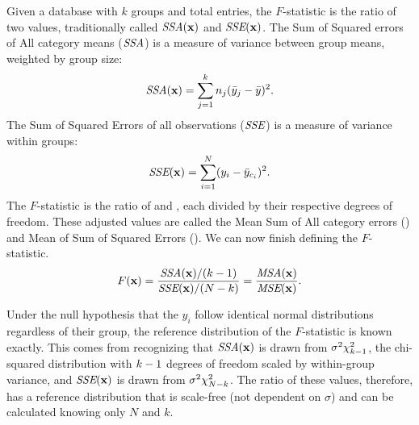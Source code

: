 \begin{definition}[$F$-Statistic] \label{def:fstat}
Given a database \x with $k$ groups and \dbsize total entries, the $F$-statistic is the ratio of two values, traditionally called $\textit{SSA}(\mathbf{x})$ and $\textit{SSE}(\mathbf{x})$.  The Sum of Squared errors of All category means ($\textit{SSA}$) is a measure of variance between group means, weighted by group size:
\begin{equation*}
\textit{SSA}(\mathbf{x}) = \sum_{j=1}^{k} n_j (\bar{y}_j - \bar{y})^2.
\end{equation*}
The Sum of Squared Errors of all observations ($\textit{SSE}$) is a measure of variance within groups:
\begin{equation*}
\textit{SSE}(\mathbf{x}) = \sum_{i=1}^{N}  (y_{i}-\bar{y}_{c_i})^2.
\end{equation*}
The $F$-statistic is the ratio of \ssa and \sse, each divided by their respective degrees of freedom.  These adjusted values are called  the Mean Sum of All category errors (\msa) and Mean of Sum of Squared Errors (\mse).
We can now finish defining the $F$-statistic.
\begin{equation*}
F(\mathbf{x})  = \frac{\textit{SSA}(\mathbf{x})/(k - 1)}{\textit{SSE}(\mathbf{x})/(N - k)} = \frac{\textit{MSA}(\mathbf{x})}{\textit{MSE}(\mathbf{x})}.
\end{equation*}
\end{definition}

Under the null hypothesis that the $y_i$ follow identical normal distributions regardless of their group, the reference distribution of the $F$-statistic is known exactly. This comes from recognizing that $\textit{SSA}(\mathbf{x})$ is drawn from $\sigma^2\chi_{k-1}^2$, the chi-squared distribution with $k-1$ degrees of freedom scaled by within-group variance, and $\textit{SSE}(\mathbf{x})$ is drawn from $\sigma^2 \chi^2_{N - k}$.  The ratio of these values, therefore, has a reference distribution that is scale-free (not dependent on $\sigma$) and can be calculated knowing only $N$ and $k$.

% 
